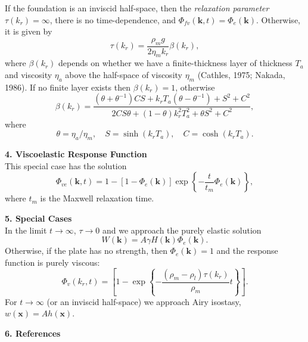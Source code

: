 \documentclass[12pt]{article}
\begin{document}
If the foundation is an inviscid half-space, then the {\it relaxation parameter} $\tau(k_r) = \infty$, there is no time-dependence,
and $\Phi_{fv}(\mathbf{k},t) = \Phi_e(\mathbf{k})$. Otherwise, it is given by
\begin{equation}
\tau(k_r) = \frac{\rho_m g}{2 \eta_m k_r} \beta(k_r),
\label{eq:Eq_10}
\end{equation}
where $\beta(k_r)$ depends on whether we have a finite-thickness layer of thickness $T_a$ and viscosity
$\eta_a$ above the half-space of viscosity $\eta_m$ (Cathles, 1975; Nakada, 1986).
If no finite layer exists then $\beta(k_r) = 1$, otherwise
\begin{equation}
\beta(k_r) = \frac{(\theta + \theta^{-1}) CS + k_r T_a (\theta - \theta^{-1}) + S^2 + C^2}{2CS\theta + (1-\theta)k_r^2 T_a^2 + \theta S^2 + C^2},
\label{eq:Eq_11}
\end{equation}
where
\begin{equation}
\theta = \eta_a/\eta_m, \quad S = \sinh (k_r T_a), \quad C = \cosh (k_r T_a).
\label{eq:Eq_12}
\end{equation}

{\center \bf 4. Viscoelastic Response Function}\\

This special case has the solution
\begin{equation}
\Phi_{ve}(\mathbf{k},t) = 1 - \left [ 1 - \Phi_e(\mathbf{k}) \right ] \exp \left \{ - \frac{t}{t_m} \Phi_e(\mathbf{k}) \right \},
\end{equation}
where $t_m$ is the Maxwell relaxation time.

{\center \bf 5. Special Cases}\\

\noindent
In the limit $t \rightarrow \infty$, $\tau  \rightarrow0$ and we approach the purely elastic solution
\begin{equation}
W(\mathbf{k}) = A \gamma H(\mathbf{k}) \Phi_e(\mathbf{k}).
\label{eq:Eq21}
\end{equation}
Otherwise, if the plate has no strength, then $\Phi_e(\mathbf{k}) = 1$ and the response function is {purely viscous}:
\begin{equation}
\Phi_v(k_r,t) = \left [ 1 - \exp \left \{ - \frac{(\rho_m - \rho_l) \tau(k_r)}{\rho_m} t \right \} \right ].
\label{eq:Eq19b}
\end{equation}
For $t \rightarrow \infty$ (or an inviscid half-space) we approach Airy isostasy, $w(\mathbf{x}) = A h(\mathbf{x})$.

{\center \bf 6. References}\\
\end{document}
